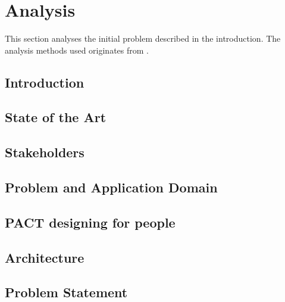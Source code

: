 \chapter{Analysis}

This section analyses the initial problem described in the introduction. The analysis methods used originates from \cite{mathiassen2001objektorienteret}. 

\section{Introduction}

\section{State of the Art}

\section{Stakeholders}

\section{Problem and Application Domain}

\section{PACT designing for people}

\section{Architecture}

\section{Problem Statement}

